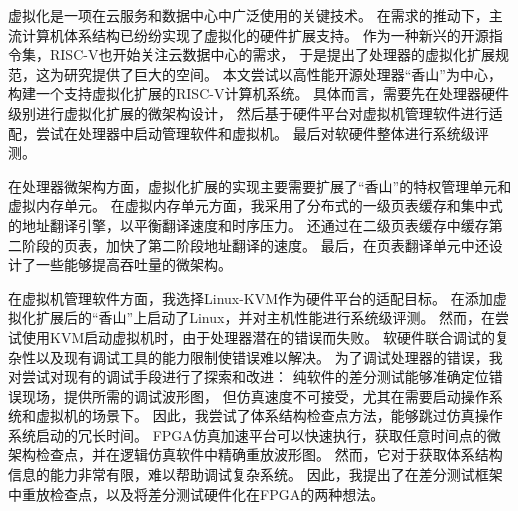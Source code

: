 \begin{cabstract}
虚拟化是一项在云服务和数据中心中广泛使用的关键技术。
在需求的推动下，主流计算机体系结构已纷纷实现了虚拟化的硬件扩展支持。
作为一种新兴的开源指令集，RISC-V也开始关注云数据中心的需求，
于是提出了处理器的虚拟化扩展规范，这为研究提供了巨大的空间。
本文尝试以高性能开源处理器“香山”为中心，构建一个支持虚拟化扩展的RISC-V计算机系统。
具体而言，需要先在处理器硬件级别进行虚拟化扩展的微架构设计，
然后基于硬件平台对虚拟机管理软件进行适配，尝试在处理器中启动管理软件和虚拟机。
最后对软硬件整体进行系统级评测。

在处理器微架构方面，虚拟化扩展的实现主要需要扩展了“香山”的特权管理单元和虚拟内存单元。
在虚拟内存单元方面，我采用了分布式的一级页表缓存和集中式的地址翻译引擎，以平衡翻译速度和时序压力。
还通过在二级页表缓存中缓存第二阶段的页表，加快了第二阶段地址翻译的速度。
最后，在页表翻译单元中还设计了一些能够提高吞吐量的微架构。

在虚拟机管理软件方面，我选择Linux-KVM作为硬件平台的适配目标。
在添加虚拟化扩展后的“香山”上启动了Linux，并对主机性能进行系统级评测。
然而，在尝试使用KVM启动虚拟机时，由于处理器潜在的错误而失败。
软硬件联合调试的复杂性以及现有调试工具的能力限制使错误难以解决。
为了调试处理器的错误，我对尝试对现有的调试手段进行了探索和改进：
纯软件的差分测试能够准确定位错误现场，提供所需的调试波形图，
但仿真速度不可接受，尤其在需要启动操作系统和虚拟机的场景下。
因此，我尝试了体系结构检查点方法，能够跳过仿真操作系统启动的冗长时间。
FPGA仿真加速平台可以快速执行，获取任意时间点的微架构检查点，并在逻辑仿真软件中精确重放波形图。
然而，它对于获取体系结构信息的能力非常有限，难以帮助调试复杂系统。
因此，我提出了在差分测试框架中重放检查点，以及将差分测试硬件化在FPGA的两种想法。

\end{cabstract}

